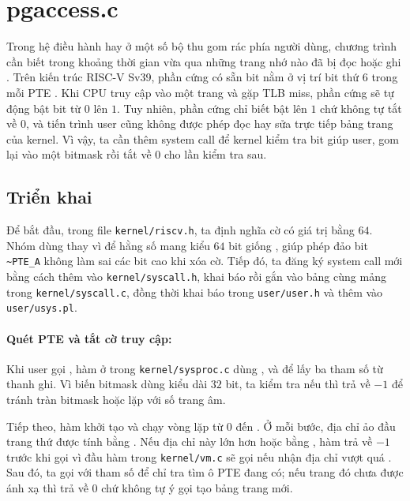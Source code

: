 \section{pgaccess.c}
Trong hệ điều hành hay ở một số bộ thu gom rác phía người dùng, chương
trình cần biết trong khoảng thời gian vừa qua những trang nhớ nào đã bị
đọc hoặc ghi \cite{hcmus_os_lab3,mitpgtbl}. Trên kiến trúc RISC-V Sv39,
phần cứng có sẵn bit  nằm ở vị trí bit thứ $6$ trong mỗi
PTE \cite{riscvspec}. Khi CPU truy cập vào một trang và gặp TLB miss,
phần cứng sẽ tự động bật bit  từ $0$ lên $1$. Tuy nhiên,
phần cứng chỉ biết bật lên $1$ chứ không tự tắt về $0$, và tiến trình
user cũng không được phép đọc hay sửa trực tiếp bảng trang của kernel.
Vì vậy, ta cần thêm system call  để kernel kiểm tra bit
 giúp user, gom lại vào một bitmask rồi tắt 
về $0$ cho lần kiểm tra sau.

\subsection{Triển khai}
Để bắt đầu, trong file \texttt{kernel/riscv.h}, ta định nghĩa cờ
 có giá trị bằng $64$. Nhóm dùng
 thay vì  để hằng số mang kiểu $64$ bit giống
, giúp phép đảo bit \texttt{\textasciitilde{}PTE\_A} không
làm sai các bit cao khi xóa cờ. Tiếp đó, ta đăng ký system call mới
bằng cách thêm  vào \texttt{kernel/syscall.h},
khai báo  rồi gắn vào bảng  cùng
mảng  trong \texttt{kernel/syscall.c}, đồng thời
khai báo  trong
\texttt{user/user.h} và thêm  vào
\texttt{user/usys.pl}.

\paragraph*{Quét PTE và tắt cờ truy cập:} Khi user gọi
, hàm  ở trong
\texttt{kernel/sysproc.c} dùng ,
 và  để lấy ba
tham số từ thanh ghi. Vì biến bitmask  dùng kiểu
 dài $32$ bit, ta kiểm tra nếu 
thì trả về $-1$ để tránh tràn bitmask hoặc lặp với số trang âm.

Tiếp theo, hàm khởi tạo  và chạy vòng lặp
 từ $0$ đến . Ở mỗi bước, địa chỉ ảo đầu trang
thứ  được tính bằng . Nếu địa chỉ này
lớn hơn hoặc bằng , hàm trả về $-1$ trước khi gọi
 vì đầu hàm  trong \texttt{kernel/vm.c} sẽ
gọi  nếu nhận địa chỉ vượt quá . Sau
đó, ta gọi  với tham số  để chỉ tra tìm ô PTE đang có; nếu trang đó chưa được ánh xạ thì
 trả về $0$ chứ không tự ý gọi  tạo bảng
trang mới.

